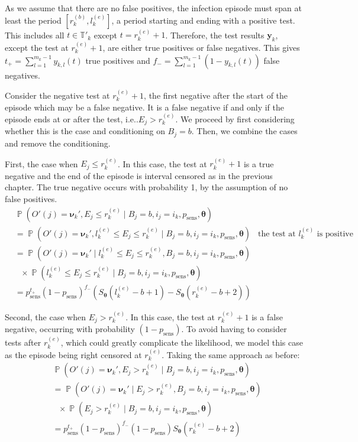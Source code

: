 \documentclass[12pt]{article}
\makeatletter
\DeclareMathOperator{\prob}{\mathbb{P}}
\renewcommand{\vec}[1]{\bm{#1}}
\newcommand{\psens}{p_\text{sens}}
\newcommand{\sched}{\mathbb{T}}
\DeclareRobustCommand\onedot{\futurelet\@let@token\@onedot}
\def\@onedot{\ifx\@let@token.\else.\null\fi\xspace}
\def\ie{i.e\onedot} \def\Ie{{I.e}\onedot}
\makeatother
\begin{document}
As we assume that there are no false positives, the infection episode must span at least the period $[r^{(b)}_k, l^{(e)}_k]$, a period starting and ending with a positive test.
This includes all $t \in \sched'_k$ except $t = r_k^{(e)}+1$.
Therefore, the test results $\vec{y}_k$, except the test at $r_k^{(e)}+1$, are either true positives or false negatives.
This gives $t_+ = \sum_{l=1}^{m_k-1} y_{k,l}(t)$ true positives and $f_- = \sum_{l=1}^{m_k-1} (1 - y_{k,l}(t))$ false negatives.

Consider the negative test at $r_k^{(e)}+1$, the first negative after the start of the episode which may be a false negative.
It is a false negative if and only if the episode ends at or after the test, \ie $E_j > r_k^{(e)}$.
We proceed by first considering whether this is the case and conditioning on $B_j = b$.
Then, we combine the cases and remove the conditioning.

First, the case when $E_j \leq r_k^{(e)}$.
In this case, the test at $r_k^{(e)}+1$ is a true negative and the end of the episode is interval censored as in the previous chapter.
The true negative occurs with probability 1, by the assumption of no false positives.
\begin{align}
&\prob(O'(j) = \vec{\nu}_k', E_j \leq r_k^{(e)} \mid B_j = b, i_j = i_k, \psens, \vec{\theta}) \\
&= \prob(O'(j) = \vec{\nu}_k', l_k^{(e)} \leq E_j \leq r_k^{(e)} \mid B_j = b, i_j = i_k, \psens, \vec{\theta}) &\text{the test at $l_k^{(e)}$ is positive} \\
&= \prob(O'(j) = \vec{\nu}_k' \mid l_k^{(e)} \leq E_j \leq r_k^{(e)}, B_j = b, i_j = i_k, \psens, \vec{\theta}) \\
&\ \ \  \times \prob(l_k^{(e)} \leq E_j \leq r_k^{(e)} \mid B_j = b, i_j = i_k, \psens, \vec{\theta}) \\
&= p_\text{sens}^{t_+} (1 - p_\text{sens})^{f_-} \left( S_{\vec{\theta}}(l_k^{(e)} - b + 1) - S_{\vec{\theta}}(r_k^{(e)} - b + 2) \right)
\label{imperf-test:eq:ll-ei-lt-ri}
\end{align}

Second, the case when $E_j > r_k^{(e)}$.
In this case, the test at $r_k^{(e)}+1$ is a false negative, occurring with probability $(1 - p_\text{sens})$.
To avoid having to consider tests after $r_k^{(e)}$, which could greatly complicate the likelihood, we model this case as the episode being right censored at $r_k^{(e)}$.
Taking the same approach as before:
\begin{align}
&\prob(O'(j) = \vec{\nu}_k', E_j > r_k^{(e)} \mid B_j = b, i_j = i_k, \psens, \vec{\theta}) \\
&= \prob(O'(j) = \vec{\nu}_k' \mid E_j > r_k^{(e)}, B_j = b, i_j = i_k, \psens, \vec{\theta}) \\
  &\ \ \  \times \prob(E_j > r_k^{(e)} \mid B_j = b, i_j = i_k, \psens, \vec{\theta}) \\
&= p_\text{sens}^{t_+} (1 - p_\text{sens})^{f_-} (1 - p_\text{sens}) S_{\vec{\theta}}(r_k^{(e)} - b + 2)
\label{imperf-test:eq:ll-ei-gt-ri}
\end{align}
\end{document}
